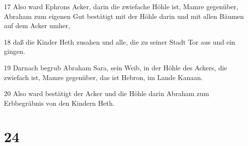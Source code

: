 \par 17 Also ward Ephrons Acker, darin die zwiefache Höhle ist, Mamre gegenüber, Abraham zum eigenen Gut bestätigt mit der Höhle darin und mit allen Bäumen auf dem Acker umher,
\par 18 daß die Kinder Heth zusahen und alle, die zu seiner Stadt Tor aus und ein gingen.
\par 19 Darnach begrub Abraham Sara, sein Weib, in der Höhle des Ackers, die zwiefach ist, Mamre gegenüber, das ist Hebron, im Lande Kanaan.
\par 20 Also ward bestätigt der Acker und die Höhle darin Abraham zum Erbbegräbnis von den Kindern Heth.

\chapter{24}

